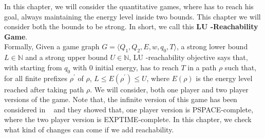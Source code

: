 In this chapter, we will consider the quantitative games, where  has to reach his goal, always maintaining the energy level inside two bounds. This chapter we will consider both the bounds to be strong. In short, we call this \textbf{LU -Reachability Game}.\\
\vskip 0.3cm
Formally, Given a game graph $G=\langle Q_1, Q_2, E, w, q_0, T \rangle$, a strong lower bound $L \in \mathbb{N}$ and a strong upper bound $U \in \mathbb{N}$,  LU -reachability objective says that, with starting from $q_0$ with $0$ initial energy,  has to reach $T$ in a path $\rho$ such that, for all finite prefixes $\rho^{\prime}$ of $\rho$, $L\leq E(\rho^{\prime})\leq U$, where $E(\rho)$ is the energy level reached after taking path $\rho$. We will consider, both one player and two player versions of the game. 
\vskip 0.3cm
Note that, the infinite version of this game has been considered in ~\cite{BouyerFLMS08} and they showed that, one player version is PSPACE-complete, where the two player version is EXPTIME-complete. In this chapter, we check what kind of changes can come if we add reachability.



